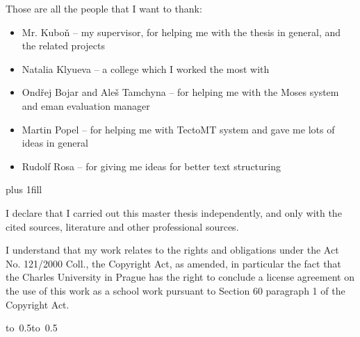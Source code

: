 \documentclass[12pt,a4paper]{report}
\let\openright=\clearpage
\begin{document}
\newpage



\openright

\noindent

Those are all the people that I want to thank:

\begin{itemize}
\item Mr. Kuboň -- my supervisor, for helping me with the thesis in general, and the related projects
\item Natalia Klyueva -- a college which I worked the most with
\item Ondřej Bojar and Aleš Tamchyna -- for helping me with the Moses system and eman evaluation manager
\item Martin Popel -- for helping me with TectoMT system and gave me lots of ideas in general
\item Rudolf Rosa -- for giving me ideas for better text structuring
\end{itemize}

\newpage


\vglue 0pt plus 1fill

\noindent
I declare that I carried out this master thesis independently, and only with the cited
sources, literature and other professional sources.

\medskip\noindent
I understand that my work relates to the rights and obligations under the Act No.
121/2000 Coll., the Copyright Act, as amended, in particular the fact that the Charles
University in Prague has the right to conclude a license agreement on the use of this
work as a school work pursuant to Section 60 paragraph 1 of the Copyright Act.

\vspace{10mm}

\hbox{\hbox to 0.5\hbox to 0.5}

\vspace{20mm}
\newpage

\end{document}
